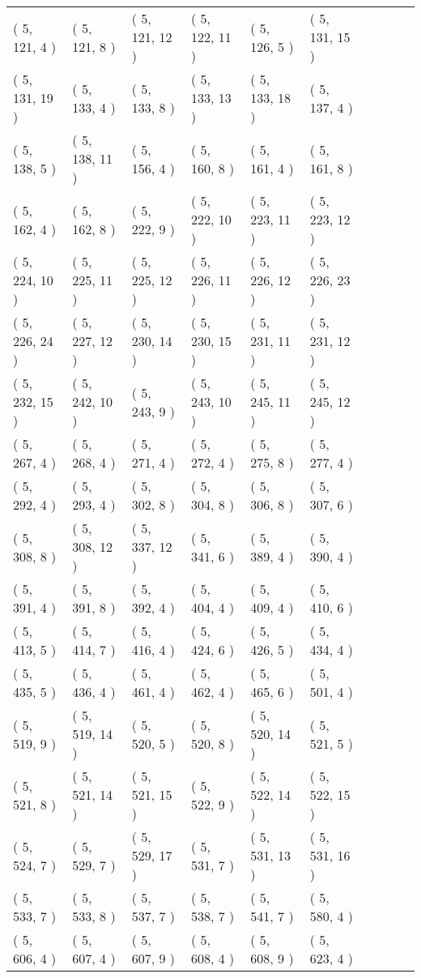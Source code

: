 \begin{longtable}{llllllllll}
    ( 5, 121, 4 ) & ( 5, 121, 8 ) & ( 5, 121, 12 ) & ( 5, 122, 11 ) & ( 5, 126, 5 ) &  ( 5, 131, 15 ) \\
     ( 5, 131, 19 ) & ( 5, 133, 4 ) & ( 5, 133, 8 ) & ( 5, 133, 13 )& ( 5, 133, 18 ) & ( 5, 137, 4 ) \\
    ( 5, 138, 5 ) & ( 5, 138, 11 ) & ( 5, 156, 4 ) &  ( 5, 160, 8 )& ( 5, 161, 4 ) & ( 5, 161, 8 ) \\
  ( 5, 162, 4 ) & ( 5, 162, 8 )&  ( 5, 222, 9 ) & ( 5, 222, 10 ) & ( 5, 223, 11 ) & ( 5, 223, 12 ) \\
      ( 5, 224, 10 ) & ( 5, 225, 11 ) & ( 5, 225, 12 ) & ( 5, 226, 11 ) & ( 5, 226, 12 )&  ( 5, 226, 23 ) \\
       ( 5, 226, 24 ) & ( 5, 227, 12 ) & ( 5, 230, 14 ) & ( 5, 230, 15 ) &  ( 5, 231, 11 ) & ( 5, 231, 12 ) \\
        ( 5, 232, 15 ) & ( 5, 242, 10 )&   ( 5, 243, 9 ) & ( 5, 243, 10 ) & ( 5, 245, 11 ) & ( 5, 245, 12 ) \\
      ( 5, 267, 4 ) &  ( 5, 268, 4 ) & ( 5, 271, 4 ) & ( 5, 272, 4 ) & ( 5, 275, 8 )&   ( 5, 277, 4 ) \\
       ( 5, 292, 4 ) & ( 5, 293, 4 ) & ( 5, 302, 8 ) &  ( 5, 304, 8 ) & ( 5, 306, 8 ) & ( 5, 307, 6 ) \\
       ( 5, 308, 8 ) & ( 5, 308, 12 ) & ( 5, 337, 12 )& ( 5, 341, 6 ) & ( 5, 389, 4 ) & ( 5, 390, 4 )\\
        ( 5, 391, 4 ) & ( 5, 391, 8 ) & ( 5, 392, 4 ) &  ( 5, 404, 4 ) &   ( 5, 409, 4 ) & ( 5, 410, 6 ) \\
       ( 5, 413, 5 ) &  ( 5, 414, 7 ) & ( 5, 416, 4 ) & ( 5, 424, 6 ) & ( 5, 426, 5 ) & ( 5, 434, 4 ) \\ 
          ( 5, 435, 5 ) & ( 5, 436, 4 ) &  ( 5, 461, 4 ) & ( 5, 462, 4 ) & ( 5, 465, 6 )&  ( 5, 501, 4 ) \\
       ( 5, 519, 9 ) & ( 5, 519, 14 ) & ( 5, 520, 5 ) & ( 5, 520, 8 ) & ( 5, 520, 14 ) & ( 5, 521, 5 ) \\
      ( 5, 521, 8 ) & ( 5, 521, 14 )& ( 5, 521, 15 ) & ( 5, 522, 9 ) & ( 5, 522, 14 ) & ( 5, 522, 15 ) \\
       ( 5, 524, 7 ) & ( 5, 529, 7 ) & ( 5, 529, 17 ) & ( 5, 531, 7 ) &   ( 5, 531, 13 )&  ( 5, 531, 16 ) \\
        ( 5, 533, 7 ) & ( 5, 533, 8 ) & ( 5, 537, 7 ) & ( 5, 538, 7 )& ( 5, 541, 7 ) & ( 5, 580, 4 ) \\
        ( 5, 606, 4 ) & ( 5, 607, 4 ) &  ( 5, 607, 9 ) &  ( 5, 608, 4 ) & ( 5, 608, 9 ) & ( 5, 623, 4 ) \\

\end{longtable}
